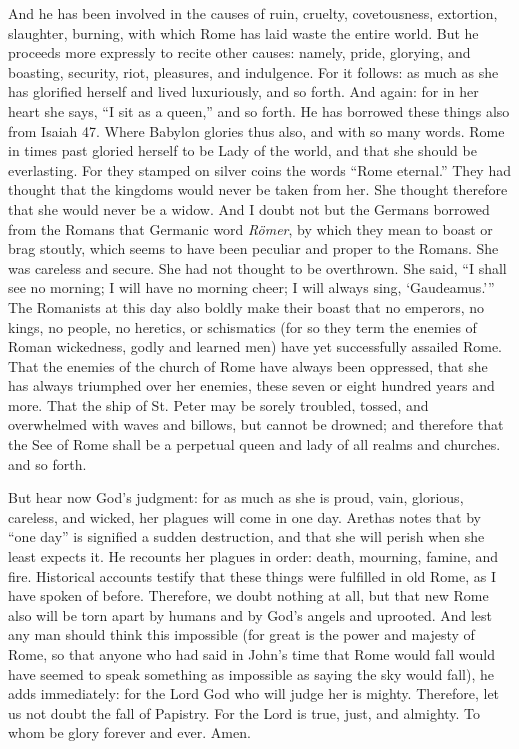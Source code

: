 And he has been involved in the causes of ruin, cruelty, covetousness, extortion, slaughter, burning, with which Rome has laid waste the entire world. But he proceeds more expressly to recite other causes: namely, pride, glorying, and boasting, security, riot, pleasures, and indulgence. For it follows: as much as she has glorified herself and lived luxuriously, and so forth. And again: for in her heart she says, “I sit as a queen,” and so forth. He has borrowed these things also from Isaiah 47. Where Babylon glories thus also, and with so many words. Rome in times past gloried herself to be Lady of the world, and that she should be everlasting. For they stamped on silver coins the words “Rome eternal.” They had thought that the kingdoms would never be taken from her. She thought therefore that she would never be a widow. And I doubt not but the Germans borrowed from the Romans that Germanic word \textit{Römer}, by which they mean to boast or brag stoutly, which seems to have been peculiar and proper to the Romans. She was careless and secure. She had not thought to be overthrown. She said, “I shall see no morning; I will have no morning cheer; I will always sing, ‘Gaudeamus.’” The Romanists at this day also boldly make their boast that no emperors, no kings, no people, no heretics, or schismatics (for so they term the enemies of Roman wickedness, godly and learned men) have yet successfully assailed Rome. That the enemies of the church of Rome have always been oppressed, that she has always triumphed over her enemies, these seven or eight hundred years and more. That the ship of St. Peter may be sorely troubled, tossed, and overwhelmed with waves and billows, but cannot be drowned; and therefore that the See of Rome shall be a perpetual queen and lady of all realms and churches. and so forth.

But hear now God’s judgment: for as much as she is proud, vain, glorious, careless, and wicked, her plagues will come in one day. Arethas notes that by “one day” is signified a sudden destruction, and that she will perish when she least expects it. He recounts her plagues in order: death, mourning, famine, and fire. Historical accounts testify that these things were fulfilled in old Rome, as I have spoken of before. Therefore, we doubt nothing at all, but that new Rome also will be torn apart by humans and by God’s angels and uprooted. And lest any man should think this impossible (for great is the power and majesty of Rome, so that anyone who had said in John’s time that Rome would fall would have seemed to speak something as impossible as saying the sky would fall), he adds immediately: for the Lord God who will judge her is mighty. Therefore, let us not doubt the fall of Papistry. For the Lord is true, just, and almighty. To whom be glory forever and ever. Amen.
